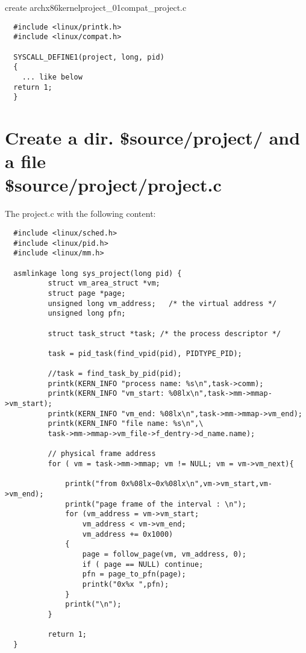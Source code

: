     create arch\/x86\/kernel\/project\_01\/compat\_project.c
    
		\begin{verbatim}
  #include <linux/printk.h>
  #include <linux/compat.h>

  SYSCALL_DEFINE1(project, long, pid)
  {
    ... like below
  return 1;
  }
		\end{verbatim}   
   	
  \section{Create a dir. \$source/project/ and a file\\  \$source/project/project.c}
  The project.c with the following content:
  \begin{verbatim}
  #include <linux/sched.h>
  #include <linux/pid.h>
  #include <linux/mm.h>

  asmlinkage long sys_project(long pid) {
          struct vm_area_struct *vm;  
          struct page *page;
          unsigned long vm_address;   /* the virtual address */
          unsigned long pfn;

          struct task_struct *task; /* the process descriptor */

          task = pid_task(find_vpid(pid), PIDTYPE_PID);        

          //task = find_task_by_pid(pid);
          printk(KERN_INFO "process name: %s\n",task->comm);
          printk(KERN_INFO "vm_start: %08lx\n",task->mm->mmap->vm_start);
          printk(KERN_INFO "vm_end: %08lx\n",task->mm->mmap->vm_end);
          printk(KERN_INFO "file name: %s\n",\
          task->mm->mmap->vm_file->f_dentry->d_name.name);

          // physical frame address
          for ( vm = task->mm->mmap; vm != NULL; vm = vm->vm_next){

              printk("from 0x%08lx~0x%08lx\n",vm->vm_start,vm->vm_end);
              printk("page frame of the interval : \n");
              for (vm_address = vm->vm_start;
                  vm_address < vm->vm_end;
                  vm_address += 0x1000)
              {
                  page = follow_page(vm, vm_address, 0);
                  if ( page == NULL) continue;
                  pfn = page_to_pfn(page);
                  printk("0x%x ",pfn);
              }
              printk("\n");
          }

          return 1;
  }
  \end{verbatim}
 
